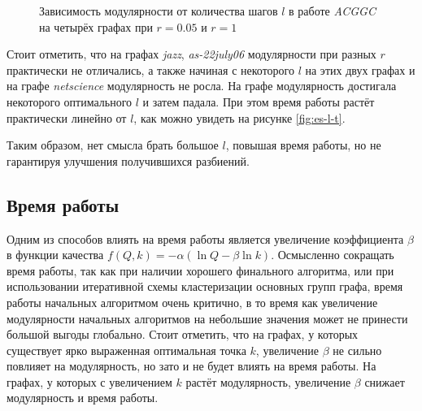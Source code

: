 \begin{figure}[H]
	\caption{Зависимость модулярности от количества шагов $l$ в работе \emph{ACGGC} на четырёх графах при $r = 0.05$ и $r = 1$}
	\label{fig:es-l-q}
\end{figure}


Стоит отметить, что на графах \emph{jazz}, \emph{as-22july06} модулярности при разных $r$ практически не отличались, а также начиная с некоторого $l$ на этих двух графах и на графе \emph{netscience} модулярность не росла. На графе \emph{\celegans} модулярность достигала некоторого оптимального $l$ и затем падала. При этом время работы растёт практически линейно от $l$, как можно увидеть на рисунке \ref{fig:es-l-t}.

Таким образом, нет смысла брать большое $l$, повышая время работы, но не гарантируя улучшения получившихся разбиений.


\subsection{Время работы}
\label{subsec:acggc_time}

Одним из способов влиять на время работы является увеличение коэффициента $\beta$ в функции качества $f(Q, k) = -\alpha(\ln Q - \beta \ln k)$. Осмысленно сокращать время работы, так как при наличии хорошего финального алгоритма, или при использовании итеративной схемы кластеризации основных групп графа, время работы начальных алгоритмом очень критично, в то время как увеличение модулярности начальных алгоритмов на небольшие значения может не принести большой выгоды глобально. Стоит отметить, что на графах, у которых существует ярко выраженная оптимальная точка $k$, увеличение $\beta$ не сильно повлияет на модулярность, но зато и не будет влиять на время работы. На графах, у которых с увеличением $k$ растёт модулярность, увеличение $\beta$ снижает модулярность и время работы.

